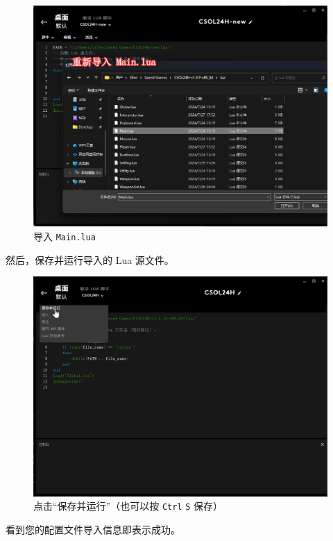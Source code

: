 \begin{figure}[H]
    \Centering
    \includegraphics[width=\textwidth]{docs/assets/update/import_main_01.png}
    \caption{导入 \lstinline{Main.lua}}
\end{figure}

然后，保存并运行导入的 Lua 源文件。

\begin{figure}[H]
    \Centering
    \includegraphics[width=\textwidth]{docs/assets/update/save_and_run_00.png}
    \caption{点击“保存并运行”（也可以按 \lstinline{Ctrl} \lstinline{S} 保存）}
\end{figure}

看到您的配置文件导入信息即表示成功。

